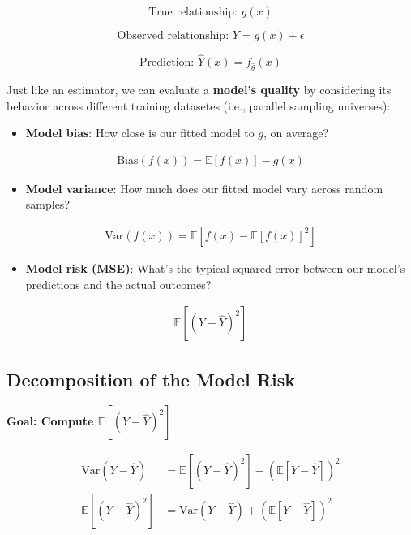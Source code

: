 \documentclass[
  letterpaper,
  DIV=11,
  numbers=noendperiod]{scrreprt}
\providecommand{\tightlist}{%
  \setlength{\itemsep}{0pt}\setlength{\parskip}{0pt}}\usepackage{longtable,booktabs,array}
\begin{document}
\[\text{True relationship: } g(x)\]

\[\text{Observed relationship: }Y = g(x) + \epsilon\]

\[\text{Prediction: }\hat{Y}(x) = f_{\hat{\theta}}(x)\]

Just like an estimator, we can evaluate a \textbf{model's quality} by
considering its behavior across different training datasetes (i.e.,
parallel sampling universes):

\begin{itemize}
\tightlist
\item
  \textbf{Model bias}: How close is our fitted model to \(g\), on
  average?
\end{itemize}

\begin{align*}
\text{Bias}(f(x)) = \mathbb{E}[f(x)] - g(x)
\end{align*}

\begin{itemize}
\tightlist
\item
  \textbf{Model variance}: How much does our fitted model vary across
  random samples?
\end{itemize}

\begin{align*}
\text{Var}(f(x)) = \mathbb{E}[f(x)- \mathbb{E}[f(x)]^2]
\end{align*}

\begin{itemize}
\tightlist
\item
  \textbf{Model risk (MSE)}: What's the typical squared error between
  our model's predictions and the actual outcomes?
\end{itemize}

\begin{align*}
\mathbb{E}[(Y - \hat{Y})^2]
\end{align*}

\subsection{Decomposition of the Model
Risk}\label{decomposition-of-the-model-risk}

\textbf{Goal: Compute \(\mathbb{E}[(Y - \hat{Y})^2]\)}

\begin{align*}
\text{Var}(Y - \hat{Y}) & = \mathbb{E}[ (Y - \hat{Y})^2 ] - \left( \mathbb{E}[ Y - \hat{Y} ] \right)^2 \\
 \mathbb{E}[ (Y - \hat{Y})^2 ] & = \text{Var}(Y - \hat{Y}) + \left( \mathbb{E}[ Y - \hat{Y} ] \right) ^2\\
 \end{align*}
\end{document}
